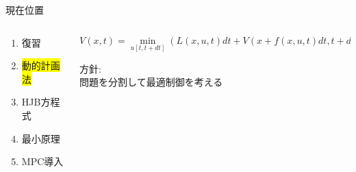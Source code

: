 \documentclass[dvipdfmx,12pt]{beamer}
\begin{document}
    \begin{frame}{現在位置}
        \footnotesize
        \begin{columns}
            \begin{column}{.35\textwidth}
                \begin{enumerate}
                    \item 復習
                    \item \colorbox{yellow}{動的計画法}
                    \item HJB方程式
                    \item 最小原理
                    \item MPC導入
                \end{enumerate}
            \end{column}
    
            \begin{column}{.7\textwidth}
                \fontsize{7.5pt}{3.5pt}\selectfont
                \begin{screen}
                    \begin{equation*}
                        V(x, t) = \min_{u[t, t+dt]} \left( L(x, u, t) dt + V \left( x + f(x, u, t) dt, t + dt \right) \right)
                    \end{equation*}
                \end{screen}
                \footnotesize
                方針:\\
                \qquad 問題を分割して最適制御を考える \\

            \end{column}
        \end{columns}
    \end{frame}
\end{document}
